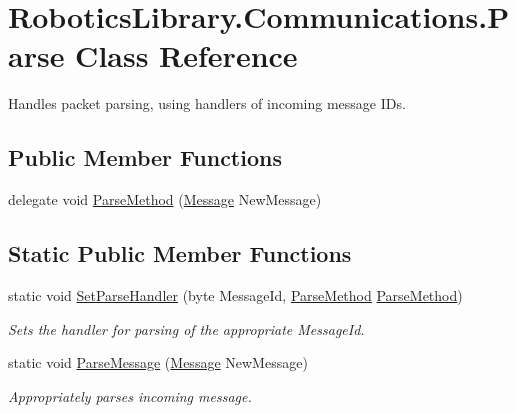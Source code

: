 \hypertarget{class_robotics_library_1_1_communications_1_1_parse}{}\section{Robotics\+Library.\+Communications.\+Parse Class Reference}
\label{class_robotics_library_1_1_communications_1_1_parse}


Handles packet parsing, using handlers of incoming message I\+Ds.  


\subsection*{Public Member Functions}
\begin{DoxyCompactItemize}
\item 
delegate void \hyperlink{class_robotics_library_1_1_communications_1_1_parse_a592095b5638ced6eacabbce7acdb5e75}{Parse\+Method} (\hyperlink{class_robotics_library_1_1_communications_1_1_message}{Message} New\+Message)
\end{DoxyCompactItemize}
\subsection*{Static Public Member Functions}
\begin{DoxyCompactItemize}
\item 
static void \hyperlink{class_robotics_library_1_1_communications_1_1_parse_a2edbe1773ccbf303fb505ce0ad2ee838}{Set\+Parse\+Handler} (byte Message\+Id, \hyperlink{class_robotics_library_1_1_communications_1_1_parse_a592095b5638ced6eacabbce7acdb5e75}{Parse\+Method} \hyperlink{class_robotics_library_1_1_communications_1_1_parse_a592095b5638ced6eacabbce7acdb5e75}{Parse\+Method})
\begin{DoxyCompactList}\small\item\em Sets the handler for parsing of the appropriate Message\+Id. \end{DoxyCompactList}\item 
static void \hyperlink{class_robotics_library_1_1_communications_1_1_parse_ad148efeadd6ab19f2fa53d4b90acf890}{Parse\+Message} (\hyperlink{class_robotics_library_1_1_communications_1_1_message}{Message} New\+Message)
\begin{DoxyCompactList}\small\item\em Appropriately parses incoming message. \end{DoxyCompactList}\end{DoxyCompactItemize}
